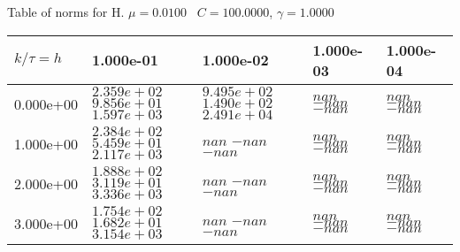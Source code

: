 \begin{center}
Table of norms for H. $\mu = 0.0100$ \, $C = 100.0000$, $\gamma = 1.0000$
  
\begin{tabular}{|p{1in}|p{1in}|p{1in}|p{1in}|p{1in}|} \hline
$k / \tau = h$ &1.000e-01 &1.000e-02 &1.000e-03 &1.000e-04 \\ \hline 
0.000e+00 & $2.359e+02$  $9.856e+01$  $1.597e+03$  & $9.495e+02$  $1.490e+02$  $2.491e+04$  & $nan$  $-nan$  $-nan$  & $nan$  $-nan$  $-nan$  \\ \hline 
1.000e+00 & $2.384e+02$  $5.459e+01$  $2.117e+03$  & $nan$  $-nan$  $-nan$  & $nan$  $-nan$  $-nan$  & $nan$  $-nan$  $-nan$  \\ \hline 
2.000e+00 & $1.888e+02$  $3.119e+01$  $3.336e+03$  & $nan$  $-nan$  $-nan$  & $nan$  $-nan$  $-nan$  & $nan$  $-nan$  $-nan$  \\ \hline 
3.000e+00 & $1.754e+02$  $1.682e+01$  $3.154e+03$  & $nan$  $-nan$  $-nan$  & $nan$  $-nan$  $-nan$  & $nan$  $-nan$  $-nan$  \\ \hline 

\end{tabular}\\[20pt]
\end{center}
